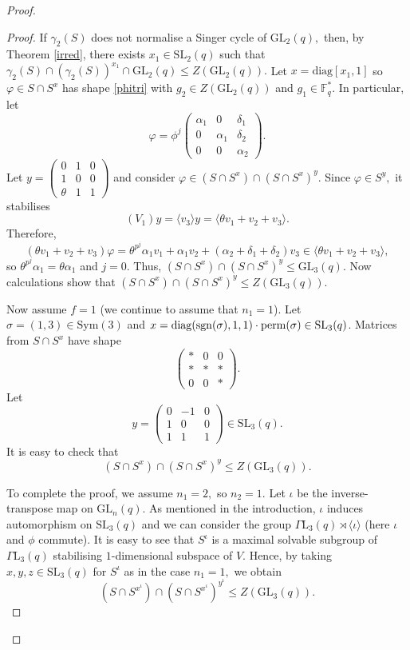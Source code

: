 \documentclass[a4paper,reqno,11pt]{amsart}
\theoremstyle{definition}
\theoremstyle{remark}
\numberwithin{equation}{section}
\newcommand{\Sym}{\mathrm{Sym}}
\newcommand{\diag}{\mathrm{diag}}
\newcommand{\sgn}{\mathrm{sgn}}
\newcommand{\GaL}{{\Gamma \mathrm{L}}}
\newcommand{\SL}{{\mathrm{SL}}}
\newcommand{\GL}{{\mathrm{GL}}}
\begin{document}
\begin{proof}
\begin{proof}
If $\gamma_2(S)$ does not normalise a Singer cycle of $\GL_2(q),$ then, by Theorem \ref{irred}, 
   there exists $x_1 \in \SL_2(q)$ such that $\gamma_2(S) \cap (\gamma_2(S))^{x_1} \cap \GL_2(q) \le Z(\GL_2(q)).$ Let $x=\diag[x_1,1]$ so $\varphi \in S \cap S^x$ has shape \eqref{phitri} with $g_2 \in Z(\GL_2(q))$ and $g_1 \in \mathbb{F}_q^*.$ In particular, let 
$$
\varphi =\phi^j
\begin{pmatrix}
\alpha_1 & 0 & \delta_1\\
 0&     \alpha_1 & \delta_2\\
0 & 0& \alpha_2  
\end{pmatrix}.
$$
 Let $y=
\begin{pmatrix}
0&1&0\\
1&0&0\\
\theta&1&1
\end{pmatrix}$ and consider $\varphi \in (S \cap S^x) \cap (S \cap S^x)^y.$ Since $\varphi \in S^y,$ it stabilises $$(V_1)y=\langle v_3 \rangle y= \langle \theta v_1 +v_2 +v_3 \rangle.$$ Therefore,
$$(\theta v_1 +v_2 +v_3)\varphi = \theta^{p^j} \alpha_1 v_1 + \alpha_1 v_2 + (\alpha_2 +\delta_1 +\delta_2)v_3 \in \langle \theta v_1 +v_2 +v_3 \rangle,$$
so $\theta^{p^j} \alpha_1= \theta \alpha_1$ and $j=0$. Thus, $(S \cap S^x) \cap (S \cap S^x)^y \le \GL_3(q).$ Now calculations  show that $(S \cap S^x) \cap (S \cap S^x)^y \le Z(\GL_3(q)).$

Now assume $f=1$ (we  continue to assume that $n_1=1$). Let $\sigma=(1,3) \in \Sym(3)$ and $x=\diag(\sgn(\sigma),1,1) \cdot {\rm perm}(\sigma) \in \SL_3(q)$. Matrices from $S \cap S^x$ have shape  
  \begin{equation*} 
  \begin{pmatrix}
*    & 0 & 0  \\
* &*    & *  \\
  0&    0    &   *      
\end{pmatrix}.
\end{equation*}
Let   
  \begin{equation*} 
y=  \begin{pmatrix}
0    & -1 & 0  \\
1 &0    & 0  \\
  1&    1    &   1      
\end{pmatrix} \in \SL_3(q).
\end{equation*}
It is easy to check that $$(S\cap S^x) \cap (S\cap S^x)^y \le Z(\GL_3(q)).$$

To complete the proof, we assume  $n_1=2,$ so $n_2=1.$ Let $\iota$ be the inverse-transpose map on $\GL_n(q)$. As mentioned in the introduction, $\iota$ induces automorphism on $\SL_3(q)$ and we can consider the group $\GaL_3(q) \rtimes \langle \iota \rangle$ (here $\iota$ and $\phi$ commute). It is easy to see that $S^{\iota}$ is a maximal solvable subgroup of $\GaL_3(q)$ stabilising $1$-dimensional subspace of $V$. Hence, by taking $x,y,z \in \SL_3(q)$ for $S^{\iota}$  as in the case $n_1=1,$ we obtain
$$(S\cap S^{x^{\iota}}) \cap (S\cap S^{x^{\iota}})^{y^{\iota}} \le Z(\GL_3(q)).$$
\end{proof} 


\end{proof}
\end{document}
